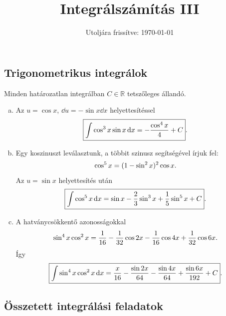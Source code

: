 \documentclass{szb-solution}
\title{Integrálszámítás III}
\date{Utoljára frissítve: \today}
\begin{document}
\maketitle

\subsection{Trigonometrikus integrálok}

Minden határozatlan integrálban $C\in\mathbb R$ tetszőleges állandó.

\begin{enumerate}[a)]
  \item Az $u=\cos x$, $\dd u=-\sin x\dd x$ helyettesítéssel
        $$
          \boxed{\int\cos^3x\sin x\mathop{}\!\mathrm{d} x=-\frac{\cos^4x}{4}+C}
          \text.
        $$

  \item Egy koszinuszt leválasztunk, a többit szinusz segítségével írjuk fel:
        $$
          \cos^5x=(1-\sin^2x)^2\cos x
          \text.
        $$
        Az $u=\sin x$ helyettesítés után
        $$
          \boxed{\int\cos^5x\mathop{}\!\mathrm{d} x
          =\sin x-\frac23\sin^3x+\frac15\sin^5x+C}
          \text.
        $$

  \item A hatványcsökkentő azonosságokkal
        $$
          \sin^4x\cos^2x
          =\frac1{16}-\frac1{32}\cos2x
           -\frac1{16}\cos4x+\frac1{32}\cos6x
          \text.
        $$
        Így
        $$
          \boxed{\int\sin^4x\cos^2x\mathop{}\!\mathrm{d} x
          =\frac{x}{16}-\frac{\sin2x}{64}
           -\frac{\sin4x}{64}+\frac{\sin6x}{192}+C}
          \text.
        $$
\end{enumerate}

\subsection{Összetett integrálási feladatok}
\end{document}
